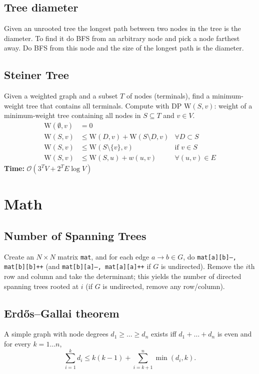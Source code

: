     \subsection{Tree diameter}
        Given an unrooted tree the longest path between two nodes in the tree is the diameter. To find it do BFS from an arbitrary node and pick a node farthest away. Do BFS from this node and the size of the longest path is the diameter.

    \subsection{Steiner Tree}
        Given a weighted graph and a subset $T$ of nodes (terminals), find a
        minimum-weight tree that contains all terminals.
        Compute with DP $\text{W}(S, v)$: weight of a minimum-weight tree
        containing all nodes in $S \subseteq T$ and $v \in V$.
        \begin{align*}
            \text{W}(\emptyset, v) &= 0 \\
            \text{W}(S, v) &\leq \text{W}(D, v) + \text{W}(S \setminus D, v) &
            \forall D \subset S \\
            \text{W}(S, v) &\leq \text{W}(S \setminus \{v\}, v) & \text{if } v \in S \\
            \text{W}(S, v) &\leq \text{W}(S, u) + w(u, v) & \forall (u, v) \in E
        \end{align*}
        {\small \textbf{Time:} $\mathcal{O}(3^T V + 2^T E \log V)$}

\section{Math}
	\subsection{Number of Spanning Trees}
		Create an $N\times N$ matrix \texttt{mat}, and for each edge $a \rightarrow b \in G$, do
		\texttt{mat[a][b]--, mat[b][b]++} (and \texttt{mat[b][a]--, mat[a][a]++} if $G$ is undirected).
		Remove the $i$th row and column and take the determinant; this yields the number of directed spanning trees rooted at $i$
		(if $G$ is undirected, remove any row/column).

	\subsection{Erdős–Gallai theorem}
		A simple graph with node degrees $d_1 \ge \dots \ge d_n$ exists iff $d_1 + \dots + d_n$ is even and for every $k = 1\dots n$,
		\[ \sum _{i=1}^{k}d_{i}\leq k(k-1)+\sum _{i=k+1}^{n}\min(d_{i},k). \]
